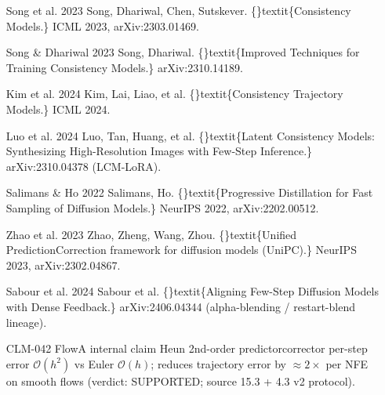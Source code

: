 \documentclass{article}
\begin{document}
\begin{itemize}
\item [Song et al. 2023] Song, Dhariwal, Chen, Sutskever. \{\}textit\{Consistency Models.\} ICML 2023, arXiv:2303.01469.
\item [Song \& Dhariwal 2023] Song, Dhariwal. \{\}textit\{Improved Techniques for Training Consistency Models.\} arXiv:2310.14189.
\item [Kim et al. 2024] Kim, Lai, Liao, et al. \{\}textit\{Consistency Trajectory Models.\} ICML 2024.
\item [Luo et al. 2024] Luo, Tan, Huang, et al. \{\}textit\{Latent Consistency Models: Synthesizing High-Resolution Images with Few-Step Inference.\} arXiv:2310.04378 (LCM-LoRA).
\item [Salimans \& Ho 2022] Salimans, Ho. \{\}textit\{Progressive Distillation for Fast Sampling of Diffusion Models.\} NeurIPS 2022, arXiv:2202.00512.
\item [Zhao et al. 2023] Zhao, Zheng, Wang, Zhou. \{\}textit\{Unified PredictionCorrection framework for diffusion models (UniPC).\} NeurIPS 2023, arXiv:2302.04867.
\item [Sabour et al. 2024] Sabour et al. \{\}textit\{Aligning Few-Step Diffusion Models with Dense Feedback.\} arXiv:2406.04344 (alpha-blending / restart-blend lineage).
\item [CLM-042] FlowA internal claim  Heun 2nd-order predictorcorrector per-step error $\mathcal{O}(h^2)$ vs Euler $\mathcal{O}(h)$; reduces trajectory error by $\approx 2\times$ per NFE on smooth flows (verdict: SUPPORTED; source  15.3 + 4.3 v2 protocol).
\end{itemize}
\end{document}
